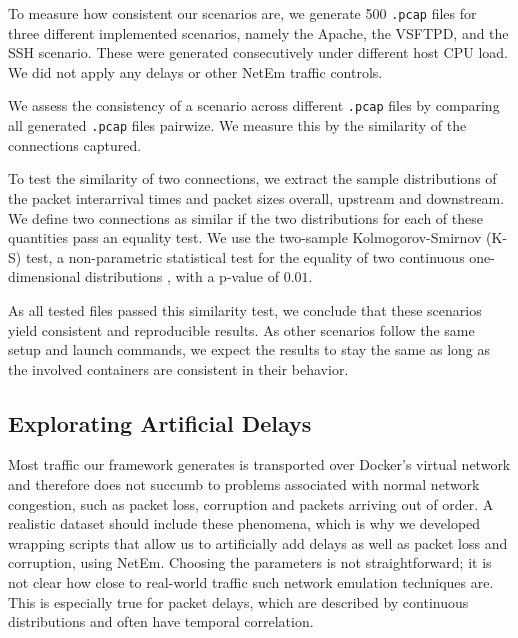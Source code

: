 \documentclass[sigconf]{acmart}
\begin{document}
To measure how consistent our scenarios are, we generate 500 \texttt{.pcap} files for three different implemented scenarios, namely the Apache, the VSFTPD, and the SSH scenario. These were generated consecutively under different host CPU load. We did not apply any delays or other NetEm traffic controls.

We assess the consistency of a scenario across different \texttt{.pcap} files by comparing all generated \texttt{.pcap} files pairwize. We measure this by the similarity of the connections captured. 

To test the similarity of two connections, we extract the sample distributions of the packet interarrival times and packet sizes overall, upstream and downstream. We define two connections as similar if the two distributions for each of these quantities pass an equality test. We use the two-sample Kolmogorov-Smirnov (K-S) test, a non-parametric statistical test for the equality of two continuous one-dimensional distributions \cite{massey1951kolmogorov}, with a p-value of $0.01$. 

As all tested files passed this similarity test, we conclude that these scenarios yield consistent and reproducible results. As other scenarios follow the same setup and launch commands, we expect the results to stay the same as long as the involved containers are consistent in their behavior.





\subsection{Explorating Artificial Delays}




Most traffic our framework generates is transported over Docker's virtual network and therefore does not succumb to problems associated with normal network congestion, such as packet loss, corruption and packets arriving out of order. A realistic dataset should include these phenomena, which is why we developed wrapping scripts that allow us to artificially add delays as well as packet loss and corruption, using NetEm. Choosing the parameters is not straightforward; it is not clear how close to real-world traffic such network emulation techniques are. This is especially true for packet delays, which are described by continuous distributions and often have temporal correlation.
\end{document}
